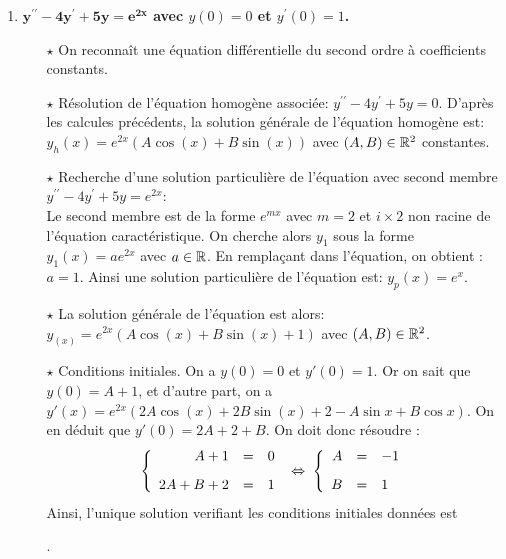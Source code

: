 \documentclass[a4paper, 11pt,reqno]{article}
\begin{document}
\begin{correction}
\begin{enumerate}
\begin{itemize}
                  .
          \end{itemize}
    \item \textbf{$\mathbf{y^{\prime\prime}-4y^{\prime}+5y=e^{2x}}$ avec $y(0)=0$ et $y^{\prime}(0)=1$.}\\
          \begin{itemize}
            \item[$\star$] On reconna\^{i}t une \'equation diff\'erentielle du second ordre \`{a} coefficients constants.
            \item[$\star$] R\'esolution de l'\'equation homog\`{e}ne associ\'ee: $y^{\prime\prime}-4y^{\prime}+5y=0$. D'apr\`es les calcules pr\'ec\'edents, la solution g\'en\'erale de l'\'equation homog\`{e}ne est: $y_h(x) = e^{2x}(A \cos(x) + B \sin(x))$ avec $(A,B)\in\mathbb{R}^2$ constantes.
            \item[$\star$] Recherche d'une solution particuli\`{e}re de l'\'equation avec second membre $y^{\prime\prime}-4y^{\prime}+5y=e^{2x}$:\\
                  \noindent Le second membre est de la forme $e^{mx}$ avec $m=2$ et $i\times 2$ non racine de l'\'equation caract\'eristique. On cherche alors $y_1$ sous la forme $y_1(x)=a e^{2 x}$ avec $a \in \mathbb{R}$. En rempla\c cant dans l'\'equation, on obtient : $a=1$. Ainsi une solution particuli\`{e}re de l'\'equation est: $y_p(x)=e^x$.
            \item[$\star$] La solution g\'en\'erale de l'\'equation est alors: $y_(x) = e^{2x}(A \cos(x) + B \sin(x)+1)$ avec $(A,B)\in\mathbb{R}^2$.
            \item[$\star$] Conditions initiales. On a $y(0)=0$ et $y'(0)=1$. Or on sait que $y(0)=A+1$, et d'autre part, on a $y'(x)=e^{2x}(2A \cos(x) + 2B \sin(x) + 2 -A\sin x +B \cos x)$. On en d\'eduit que $y'(0)=2A+2+B$. On doit donc r\'esoudre :
                  $$\left\{ \begin{array}{rcl}
                      A+1    & = & 0\vsec \\
                      2A+B+2 & = & 1
                    \end{array} \right. \; \Leftrightarrow \;
                    \left\{ \begin{array}{rcl}
                      A & = & -1 \vsec \\
                      B & = & 1
                    \end{array} \right.$$
                  Ainsi, l'unique solution v\?erifiant les conditions initiales donn\'ees est

                  .
          \end{itemize}
  \end{enumerate}
\end{correction}
\vspace{0.5cm}
\end{document}
